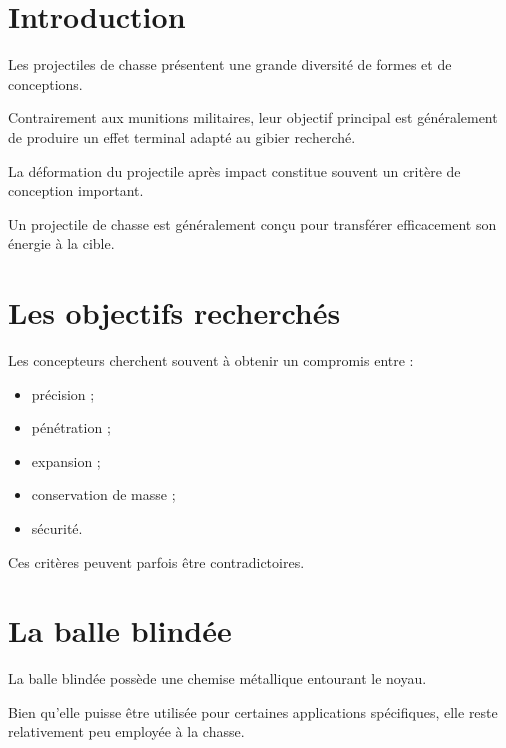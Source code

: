 
\section{Introduction}

Les projectiles de chasse présentent une grande diversité de formes et de
conceptions.

Contrairement aux munitions militaires, leur objectif principal est
généralement de produire un effet terminal adapté au gibier recherché.

La déformation du projectile après impact constitue souvent un critère de
conception important.

\begin{aretenir}

Un projectile de chasse est généralement conçu pour transférer efficacement
son énergie à la cible.

\end{aretenir}

\section{Les objectifs recherchés}

Les concepteurs cherchent souvent à obtenir un compromis entre :

\begin{itemize}
    \item précision ;
    \item pénétration ;
    \item expansion ;
    \item conservation de masse ;
    \item sécurité.
\end{itemize}

Ces critères peuvent parfois être contradictoires.

\section{La balle blindée}

La balle blindée possède une chemise métallique entourant le noyau.

Bien qu'elle puisse être utilisée pour certaines applications spécifiques,
elle reste relativement peu employée à la chasse.

